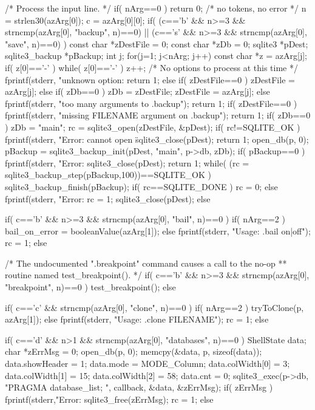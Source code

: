 \begin{Codex}[label=shell.c,numbers=left]
{  /* Process the input line.
  */
  if( nArg==0 ) return 0; /* no tokens, no error */
  n = strlen30(azArg[0]);
  c = azArg[0][0];
  if( (c=='b' && n>=3 && strncmp(azArg[0], "backup", n)==0)
   || (c=='s' && n>=3 && strncmp(azArg[0], "save", n)==0)
  ){
    const char *zDestFile = 0;
    const char *zDb = 0;
    sqlite3 *pDest;
    sqlite3_backup *pBackup;
    int j;
    for(j=1; j<nArg; j++){
      const char *z = azArg[j];
      if( z[0]=='-' ){
        while( z[0]=='-' ) z++;
        /* No options to process at this time */
        {
          fprintf(stderr, "unknown option: %
          return 1;
        }
      }else if( zDestFile==0 ){
        zDestFile = azArg[j];
      }else if( zDb==0 ){
        zDb = zDestFile;
        zDestFile = azArg[j];
      }else{
        fprintf(stderr, "too many arguments to .backup\n");
        return 1;
      }
    }
    if( zDestFile==0 ){
      fprintf(stderr, "missing FILENAME argument on .backup\n");
      return 1;
    }
    if( zDb==0 ) zDb = "main";
    rc = sqlite3_open(zDestFile, &pDest);
    if( rc!=SQLITE_OK ){
      fprintf(stderr, "Error: cannot open \"%
      sqlite3_close(pDest);
      return 1;
    }
    open_db(p, 0);
    pBackup = sqlite3_backup_init(pDest, "main", p->db, zDb);
    if( pBackup==0 ){
      fprintf(stderr, "Error: %
      sqlite3_close(pDest);
      return 1;
    }
    while(  (rc = sqlite3_backup_step(pBackup,100))==SQLITE_OK ){}
    sqlite3_backup_finish(pBackup);
    if( rc==SQLITE_DONE ){
      rc = 0;
    }else{
      fprintf(stderr, "Error: %
      rc = 1;
    }
    sqlite3_close(pDest);
  }else

  if( c=='b' && n>=3 && strncmp(azArg[0], "bail", n)==0 ){
    if( nArg==2 ){
      bail_on_error = booleanValue(azArg[1]);
    }else{
      fprintf(stderr, "Usage: .bail on|off\n");
      rc = 1;
    }
  }else

  /* The undocumented ".breakpoint" command causes a call to the no-op
  ** routine named test_breakpoint().
  */
  if( c=='b' && n>=3 && strncmp(azArg[0], "breakpoint", n)==0 ){
    test_breakpoint();
  }else

  if( c=='c' && strncmp(azArg[0], "clone", n)==0 ){
    if( nArg==2 ){
      tryToClone(p, azArg[1]);
    }else{
      fprintf(stderr, "Usage: .clone FILENAME\n");
      rc = 1;
    }
  }else

  if( c=='d' && n>1 && strncmp(azArg[0], "databases", n)==0 ){
    ShellState data;
    char *zErrMsg = 0;
    open_db(p, 0);
    memcpy(&data, p, sizeof(data));
    data.showHeader = 1;
    data.mode = MODE_Column;
    data.colWidth[0] = 3;
    data.colWidth[1] = 15;
    data.colWidth[2] = 58;
    data.cnt = 0;
    sqlite3_exec(p->db, "PRAGMA database_list; ", callback, &data, &zErrMsg);
    if( zErrMsg ){
      fprintf(stderr,"Error: %
      sqlite3_free(zErrMsg);
      rc = 1;
    }
  }else

}
\end{Codex}
